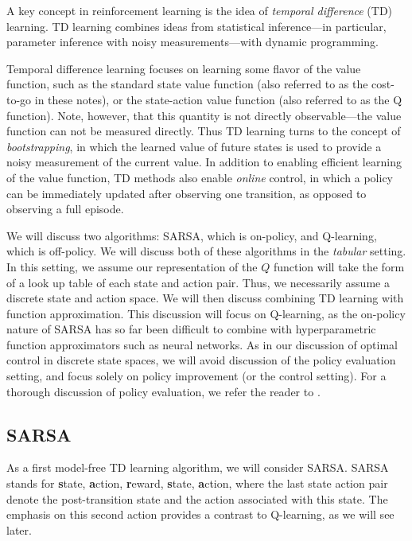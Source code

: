 A key concept in reinforcement learning is the idea of \textit{temporal difference} (TD) learning. TD learning combines ideas from statistical inference---in particular, parameter inference with noisy measurements---with dynamic programming. 

Temporal difference learning focuses on learning some flavor of the value function, such as the standard state value function (also referred to as the cost-to-go in these notes), or the state-action value function (also referred to as the Q function). Note, however, that this quantity is not directly observable---the value function can not be measured directly. Thus TD learning turns to the concept of \textit{bootstrapping}, in which the learned value of future states is used to provide a noisy measurement of the current value. In addition to enabling efficient learning of the value function, TD methods also enable \textit{online} control, in which a policy can be immediately updated after observing one transition, as opposed to observing a full episode. 

We will discuss two algorithms: SARSA, which is on-policy, and Q-learning, which is off-policy. We will discuss both of these algorithms in the \textit{tabular} setting. In this setting, we assume our representation of the $Q$ function will take the form of a look up table of each state and action pair. Thus, we necessarily assume a discrete state and action space. We will then discuss combining TD learning with function approximation. This discussion will focus on Q-learning, as the on-policy nature of SARSA has so far been difficult to combine with hyperparametric function approximators such as neural networks. As in our discussion of optimal control in discrete state spaces, we will avoid discussion of the policy evaluation setting, and focus solely on policy improvement (or the control setting). For a thorough discussion of policy evaluation, we refer the reader to \cite{sutton2018reinforcement}.

\subsection{SARSA}

As a first model-free TD learning algorithm, we will consider SARSA. SARSA stands for \textbf{s}tate, \textbf{a}ction, \textbf{r}eward, \textbf{s}tate, \textbf{a}ction, where the last state action pair denote the post-transition state and the action associated with this state. The emphasis on this second action provides a contrast to Q-learning, as we will see later. 


